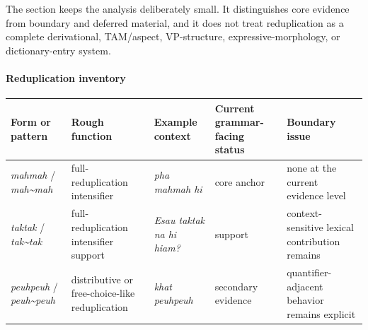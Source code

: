 \documentclass[
  11pt,
  a4paper,
]{article}
\newcounter{none} %
\newcommand{\tdim}[1]{\textit{#1}}
\begin{document}
The section keeps the analysis deliberately small. It distinguishes core
evidence from boundary and deferred material, and it does not treat
reduplication as a complete derivational, TAM/aspect, VP-structure,
expressive-morphology, or dictionary-entry system.

\paragraph{Reduplication inventory}\label{reduplication-inventory}

{\def\LTcaptype{none} %
\begin{longtable}[]{@{}
  >{\raggedright\arraybackslash}p{}
  >{\raggedright\arraybackslash}p{}
  >{\raggedright\arraybackslash}p{}
  >{\raggedright\arraybackslash}p{}
  >{\raggedright\arraybackslash}p{}@{}}
\toprule\noalign{}
\begin{minipage}[b]{\linewidth}\raggedright
Form or pattern
\end{minipage} & \begin{minipage}[b]{\linewidth}\raggedright
Rough function
\end{minipage} & \begin{minipage}[b]{\linewidth}\raggedright
Example context
\end{minipage} & \begin{minipage}[b]{\linewidth}\raggedright
Current grammar-facing status
\end{minipage} & \begin{minipage}[b]{\linewidth}\raggedright
Boundary issue
\end{minipage} \\
\midrule\noalign{}
\endhead
\bottomrule\noalign{}
\endlastfoot
\tdim{mahmah} / \tdim{mah\textasciitilde{}mah} & full-reduplication
intensifier & \tdim{pha mahmah hi} & core anchor & none at the current
evidence level \\
\tdim{taktak} / \tdim{tak\textasciitilde{}tak} & full-reduplication
intensifier support & \tdim{Esau taktak na hi hiam?} & support &
context-sensitive lexical contribution remains \\
\tdim{peuhpeuh} / \tdim{peuh\textasciitilde{}peuh} & distributive or
free-choice-like reduplication & \tdim{khat peuhpeuh} & secondary
evidence & quantifier-adjacent behavior remains explicit \\

\end{longtable}}
\end{document}
